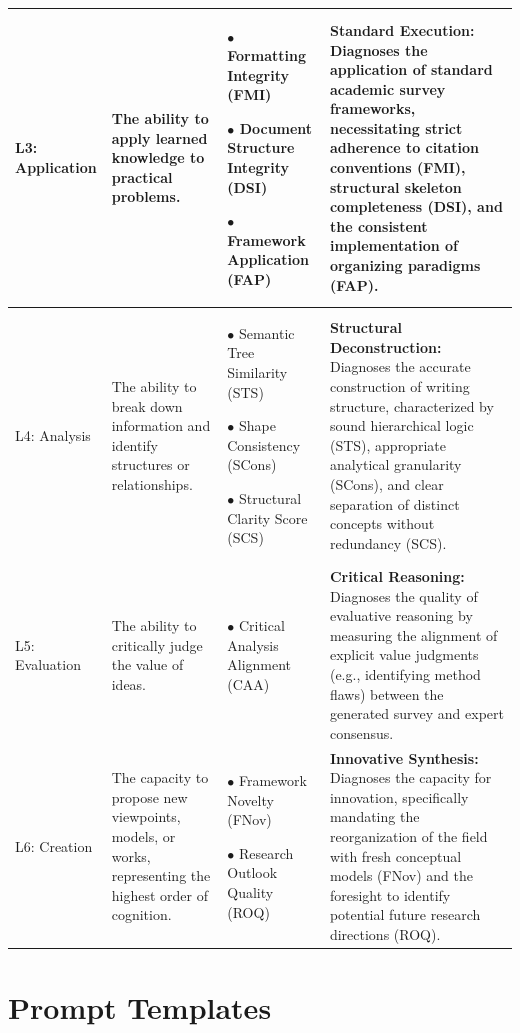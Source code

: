 \documentclass[11pt]{article}
\begin{document}
\begin{table}[ht]
\begin{tabularx}{\textwidth}{l >{\hsize}Y >{\hsize}Y >{\hsize}Y}
L3: Application & 
The ability to apply learned knowledge to practical problems. & 
$\bullet$ Formatting Integrity (FMI) \par
$\bullet$ Document Structure Integrity (DSI) \par
$\bullet$ Framework Application (FAP) & 
\textbf{Standard Execution:} Diagnoses the application of standard academic survey frameworks, necessitating strict adherence to citation conventions (FMI), structural skeleton completeness (DSI), and the consistent implementation of organizing paradigms (FAP).  \\ \midrule

L4: Analysis & 
The ability to break down information and identify structures or relationships. & 
$\bullet$ Semantic Tree Similarity (STS) \par
$\bullet$ Shape Consistency (SCons) \par
$\bullet$ Structural Clarity Score (SCS) & 
\textbf{Structural Deconstruction:} Diagnoses the accurate construction of writing structure, characterized by sound hierarchical logic (STS), appropriate analytical granularity (SCons), and clear separation of distinct concepts without redundancy (SCS). \\ \midrule

L5: Evaluation & 
The ability to critically judge the value of ideas. & 
$\bullet$ Critical Analysis Alignment (CAA) & 
\textbf{Critical Reasoning:} Diagnoses the quality of evaluative reasoning by measuring the alignment of explicit value judgments (e.g., identifying method flaws) between the generated survey and expert consensus. \\ \midrule

L6: Creation & 
The capacity to propose new viewpoints, models, or works, representing the highest order of cognition. & 
$\bullet$ Framework Novelty (FNov) \par
$\bullet$ Research Outlook Quality (ROQ) & 
\textbf{Innovative Synthesis:} Diagnoses the capacity for innovation, specifically mandating the reorganization of the field with fresh conceptual models (FNov) and the foresight to identify potential future research directions (ROQ). \\ 
\bottomrule
\end{tabularx}
\end{table}


\section{Prompt Templates}
\label{sec:appendix_prompts}
\end{document}
